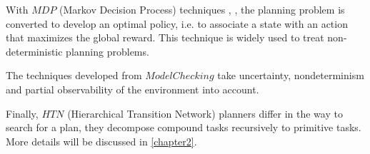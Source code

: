 With $MDP$ (Markov Decision Process) techniques \cite{MT08}, \cite{SWD08}, the planning problem is converted to develop an optimal policy, i.e. to associate a state with an action that maximizes the global reward. This technique is widely used to treat non-deterministic planning problems. 


The techniques developed from $Model Checking$ \cite{PT01} take uncertainty, nondeterminism and partial observability of the environment into account.

Finally, $HTN$ (Hierarchical Transition Network) planners \cite{3}\cite{4} differ in the way to search for a plan, they decompose compound tasks recursively to primitive tasks. More details will be discussed in \autoref{chapter2}.

